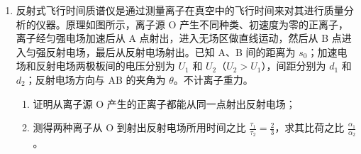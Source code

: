 \documentclass[\gkver]{gaokaozhenti}
\begin{document}
\begin{enumerate}
{代入数据解得 $V_{2}=7.5\UL$

泵出油的体积 $\Delta V=V_{2}-V_{1}=1.5\UL$

（2）对原有氮气，由理想气体状态方程 $\frac{p_{1}V_{1}}{T_{1}}=\frac{p_{1}V_{3}}{T_{2}}$

代入数据解得 $V_{3}=5.4\UL$

同温同压下，气体质量之比等于体积之比，即 $\frac{\Delta m}{m_{0}}=\frac{V_{1}-V_{3}}{V_{3}}=\frac{1}{9}$
}

\item
反射式飞行时间质谱仪是通过测量离子在真空中的飞行时间来对其进行质量分析的仪器。原理如图所示，离子源 O 产生不同种类、初速度为零的正离子，离子经匀强电场加速后从 A 点射出，进入无场区做直线运动，然后从 B 点进入匀强反射电场，最后从反射电场射出。已知 A、B 间的距离为 $s_{0}$；加速电场和反射电场两极板间的电压分别为 $U_{1}$ 和 $U_{2}$（$U_{2}>U_{1}$），间距分别为 $d_{1}$ 和 $d_{2}$；反射电场方向与 AB 的夹角为 $\theta$。不计离子重力。
\begin{enumerate}
	\item
	证明从离子源 O 产生的正离子都能从同一点射出反射电场；
	\item
	测得两种离子从 O 到射出反射电场所用时间之比 $\frac{\tau_{1}}{\tau_{2}}=\frac{2}{3}$，求其比荷之比 $\frac{\alpha_{1}}{\alpha_{2}}$。
\end{enumerate}
\onepicture[align=right, w=7.16cm]{}

\end{enumerate}
\end{document}
